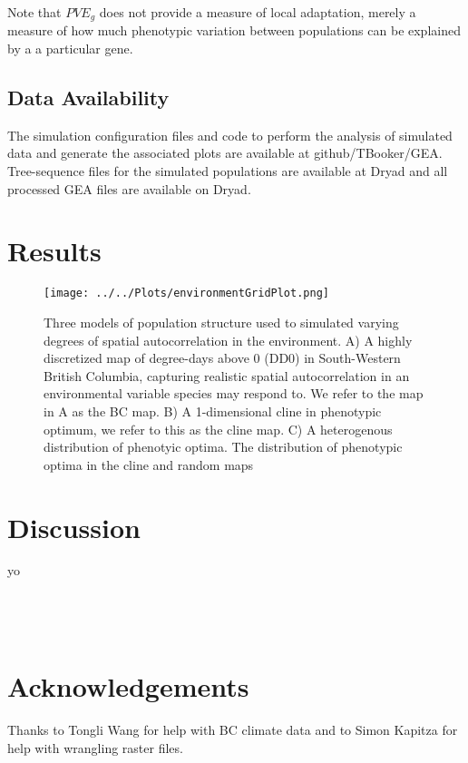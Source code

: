 \documentclass[11pt,twoside,lineno]{GSA_format}
\begin{document}
Note that $PVE_g$ does not provide a measure of local adaptation, merely a measure of how much phenotypic variation between populations can be explained by a a particular gene. 

\subsection{Data Availability}

The simulation configuration files and code to perform the analysis of simulated data and generate the associated plots are available at github/TBooker/GEA. Tree-sequence files for the simulated populations are available at Dryad and all processed GEA files are available on Dryad. 


\section{Results}

\begin{figure}
  \texttt{[image: ../../Plots/environmentGridPlot.png]}
  \caption{Three models of population structure used to simulated varying degrees of spatial autocorrelation in the environment. A) A highly discretized map of degree-days above 0 (DD0) in South-Western British Columbia, capturing realistic spatial autocorrelation in an environmental variable species may respond to. We refer to the map in A as the BC map. B) A 1-dimensional cline in phenotypic optimum, we refer to this as the cline map. C) A heterogenous distribution of phenotyic optima. The distribution of phenotypic optima in the cline and random maps}
  
  \label{fig:boat1}
\end{figure}

\section{Discussion}
yo\\
\\
\\
\\



\section{Acknowledgements}

Thanks to Tongli Wang for help with BC climate data and to Simon Kapitza for help with wrangling raster files. 



%
\end{document}

